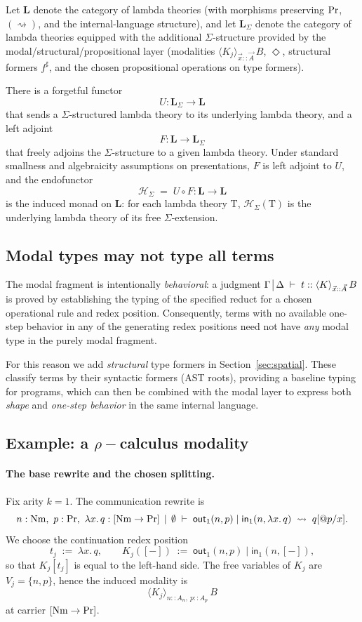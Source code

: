 \documentclass[11pt]{article}
\makeatletter
\theoremstyle{definition}
\theoremstyle{plain}
\theoremstyle{remark}
\theoremstyle{plain}
\newcommand{\judg}[3]{%
  \begingroup
    \setlength{\arraycolsep}{0.3ex}%
    \ensuremath{%
      \begin{array}[t]{@{}l@{\;}|@{\;}l@{}}%
        #1 & #2%
      \end{array}%
      \;\vdash\; #3%
    }%
  \endgroup
}
\newcommand{\angles}[3]{\langle #1 \rangle_{#2}\,#3}
\renewcommand{\Pr}{{\rm Pr}}
\newcommand{\Nm}{{\rm Nm}}
\newcommand{\rsq}{\rightsquigarrow}
\newcommand{\ctx}{\,|\,}
\newcommand{\mrm}[1]{\mathrm{#1}}
\newcommand{\T}{\mrm{T}}
\makeatother
\begin{document}
Let $\mathbf{L}$ denote the category of lambda theories (with morphisms preserving
$\Pr$, $(\rsq)$, and the internal-language structure), and let $\mathbf{L}_\Sigma$ denote the
category of lambda theories equipped with the additional $\Sigma$-structure provided by the
modal/structural/propositional layer (modalities $\angles{K_j}{\vec{x}::\vec{A}}{B}$, $\Diamond$, structural
formers $f^\sharp$, and the chosen propositional operations on type formers).

There is a forgetful functor
\[
  U : \mathbf{L}_\Sigma \longrightarrow \mathbf{L}
\]
that sends a $\Sigma$-structured lambda theory to its underlying lambda theory, and a left adjoint
\[
  F : \mathbf{L} \longrightarrow \mathbf{L}_\Sigma
\]
that freely adjoins the $\Sigma$-structure to a given lambda theory.  Under standard smallness and
algebraicity assumptions on presentations, $F$ is left adjoint to $U$, and the endofunctor
\[
  \mathcal{H}_\Sigma \;=\; U \circ F : \mathbf{L} \longrightarrow \mathbf{L}
\]
is the induced monad on $\mathbf{L}$: for each lambda theory $\T$, $\mathcal{H}_\Sigma(\T)$ is the
underlying lambda theory of its free $\Sigma$-extension.

\subsection{Modal types may not type all terms}
The modal fragment is intentionally \emph{behavioral}: a judgment
$ \judg{\Gamma}{\Delta}{t :: \angles{K}{\vec{x}::\vec{A}}{B}} $
is proved by establishing the typing of the specified reduct for a chosen operational rule and redex position.  Consequently, terms with no available one-step behavior
in any of the generating redex positions need not have \emph{any} modal type in the purely modal fragment.

For this reason we add \emph{structural} type formers in
Section~\ref{sec:spatial}.  These classify terms by their syntactic formers (AST roots),
providing a baseline typing for programs,
which can then be combined with the modal layer to express both \emph{shape} and \emph{one-step
behavior} in the same internal language.

\subsection{Example: a $\rho-$calculus modality}
\label{subsec:rho-comm-seven-axes}

\paragraph{The base rewrite and the chosen splitting.}
Fix arity \(k=1\). The communication rewrite is
\[
  n:\Nm,\ p:\Pr,\ \lambda x.\,q : [\Nm \to \Pr]
  \;\ctx\; \emptyset
  \;\vdash\;
  \mathsf{out}_1(n,p) \mid \mathsf{in}_1(n,\lambda x.\,q)
  \;\rsq\;
  q[@p/x].
\]
We choose the continuation redex position
\[
  t_j \;:=\; \lambda x.\,q,
  \qquad
  K_j([-]) \;:=\; \mathsf{out}_1(n,p) \mid \mathsf{in}_1(n,[-]),
\]
so that \(K_j[t_j]\) is equal to the left-hand side.
The free variables of \(K_j\) are \(V_j=\{n,p\}\), hence the induced modality is
\[
  \angles{K_j}{n::A_n,\ p::A_p}{B}
\]
at carrier \([\Nm\to\Pr]\).
\end{document}
